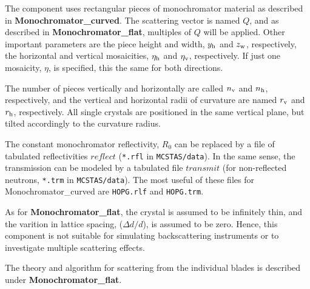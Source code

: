 The component uses rectangular pieces of monochromator material
as described in {\bf Monochromator\_curved}.
The scattering vector is named $Q$, and as described in
{\bf Monochromator\_flat}, multiples of $Q$ will be applied.
Other important parameters are the piece height and width,
$y_{\rm h}$ and $z_{\rm w}$, respectively, the
horizontal and vertical mosaicities, $\eta_{\rm h}$ and $\eta_{\rm v}$,
respectively.
If just one mosaicity, $\eta$, is specified, this the same for both directions.

The number of pieces vertically and horizontally are called
$n_{\rm v}$ and $n_{\rm h}$, respectively, and the vertical and horizontal
radii of curvature are named $r_{\rm v}$ and $r_{\rm h}$, respectively.
All single crystals are positioned in the same vertical plane,
but tilted accordingly to the curvature radius.

The constant monochromator reflectivity, $R_0$ can be replaced by
a file of tabulated reflectivities $reflect$ (\verb+*.rfl+ in \verb+MCSTAS/data+). In the same sense, the transmission
can be modeled by a tabulated file $transmit$ (for non-reflected neutrons, \verb+*.trm+ in \verb+MCSTAS/data+).
The most useful of these files for Monochromator\_curved are \verb+HOPG.rlf+ and \verb+HOPG.trm+.

As for {\bf Monochromator\_flat}, the crystal is assumed to be infinitely
thin, and the varition in lattice spacing, ($\Delta d/d$),
is assumed to be zero. Hence, this
component is not suitable for simulating backscattering instruments or to
investigate multiple scattering effects.

The theory and algorithm for scattering from
the individual blades is described under {\bf Monochromator\_flat}.
